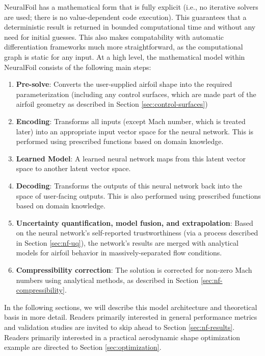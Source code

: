     \noindent NeuralFoil has a mathematical form that is fully explicit (i.e., no iterative solvers are used; there is no value-dependent code execution). This guarantees that a deterministic result is returned in bounded computational time and without any need for initial guesses. This also makes compatability with automatic differentiation frameworks much more straightforward, as the computational graph is static for any input. At a high level, the mathematical model within NeuralFoil consists of the following main steps:

    \begin{enumerate}
        \item \textbf{Pre-solve}: Converts the user-supplied airfoil shape into the required parameterization (including any control surfaces, which are made part of the airfoil geometry as described in Section \ref{sec:control-surfaces})
        \item \textbf{Encoding}: Transforms all inputs (except Mach number, which is treated later) into an appropriate input vector space for the neural network. This is performed using prescribed functions based on domain knowledge.
        \item \textbf{Learned Model}: A learned neural network maps from this latent vector space to another latent vector space.
        \item \textbf{Decoding}: Transforms the outputs of this neural network back into the space of user-facing outputs. This is also performed using prescribed functions based on domain knowledge.
        \item \textbf{Uncertainty quantification, model fusion, and extrapolation}: Based on the neural network's self-reported trustworthiness (via a process described in Section \ref{sec:nf-uq}), the network's results are merged with analytical models for airfoil behavior in massively-separated flow conditions.
        \item \textbf{Compressibility correction}: The solution is corrected for non-zero Mach numbers using analytical methods, as described in Section \ref{sec:nf-compressibility}.
    \end{enumerate}

    \noindent In the following sections, we will describe this model architecture and theoretical basis in more detail. Readers primarily interested in general performance metrics and validation studies are invited to skip ahead to Section \ref{sec:nf-results}. Readers primarily interested in a practical aerodynamic shape optimization example are directed to Section \ref{sec:optimization}.

